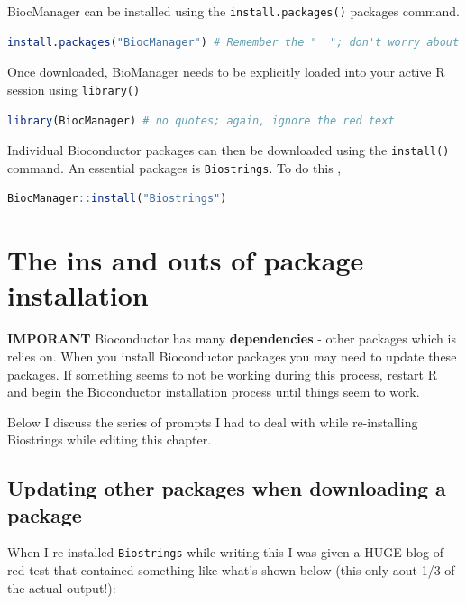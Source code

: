 \documentclass[
]{book}
\newcommand{\passthrough}[1]{#1}
\begin{document}
BiocManager can be installed using the \passthrough{\lstinline!install.packages()!} packages command.

\begin{lstlisting}[language=R]
install.packages("BiocManager") # Remember the "  "; don't worry about the red text
\end{lstlisting}

Once downloaded, BioManager needs to be explicitly loaded into your active R session using \passthrough{\lstinline!library()!}

\begin{lstlisting}[language=R]
library(BiocManager) # no quotes; again, ignore the red text
\end{lstlisting}

Individual Bioconductor packages can then be downloaded using the \passthrough{\lstinline!install()!} command. An essential packages is \passthrough{\lstinline!Biostrings!}. To do this ,

\begin{lstlisting}[language=R]
BiocManager::install("Biostrings")
\end{lstlisting}

\hypertarget{the-ins-and-outs-of-package-installation}{%
\section{The ins and outs of package installation}\label{the-ins-and-outs-of-package-installation}}

\textbf{IMPORANT} Bioconductor has many \textbf{dependencies} - other packages which is relies on. When you install Bioconductor packages you may need to update these packages. If something seems to not be working during this process, restart R and begin the Bioconductor installation process until things seem to work.

Below I discuss the series of prompts I had to deal with while re-installing Biostrings while editing this chapter.

\hypertarget{updating-other-packages-when-downloading-a-package}{%
\subsection{Updating other packages when downloading a package}\label{updating-other-packages-when-downloading-a-package}}

When I re-installed \passthrough{\lstinline!Biostrings!} while writing this I was given a HUGE blog of red test that contained something like what's shown below (this only aout 1/3 of the actual output!):
\end{document}
